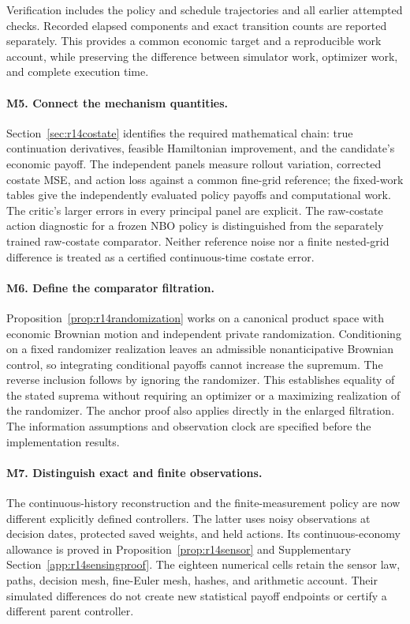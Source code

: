 Verification includes the policy and schedule trajectories and all earlier attempted checks. Recorded elapsed components and exact transition counts are reported separately. This provides a common economic target and a reproducible work account, while preserving the difference between simulator work, optimizer work, and complete execution time.

\paragraph*{M5. Connect the mechanism quantities.}
Section~\ref{sec:r14costate} identifies the required mathematical chain: true continuation derivatives, feasible Hamiltonian improvement, and the candidate's economic payoff. The independent panels measure rollout variation, corrected costate MSE, and action loss against a common fine-grid reference; the fixed-work tables give the independently evaluated policy payoffs and computational work. The critic's larger errors in every principal panel are explicit. The raw-costate action diagnostic for a frozen NBO policy is distinguished from the separately trained raw-costate comparator. Neither reference noise nor a finite nested-grid difference is treated as a certified continuous-time costate error.

\paragraph*{M6. Define the comparator filtration.}
Proposition~\ref{prop:r14randomization} works on a canonical product space with economic Brownian motion and independent private randomization. Conditioning on a fixed randomizer realization leaves an admissible nonanticipative Brownian control, so integrating conditional payoffs cannot increase the supremum. The reverse inclusion follows by ignoring the randomizer. This establishes equality of the stated suprema without requiring an optimizer or a maximizing realization of the randomizer. The anchor proof also applies directly in the enlarged filtration. The information assumptions and observation clock are specified before the implementation results.

\paragraph*{M7. Distinguish exact and finite observations.}
The continuous-history reconstruction and the finite-measurement policy are now different explicitly defined controllers. The latter uses noisy observations at decision dates, protected saved weights, and held actions. Its continuous-economy allowance is proved in Proposition~\ref{prop:r14sensor} and Supplementary Section~\ref{app:r14sensingproof}. The eighteen numerical cells retain the sensor law, paths, decision mesh, fine-Euler mesh, hashes, and arithmetic account. Their simulated differences do not create new statistical payoff endpoints or certify a different parent controller.

